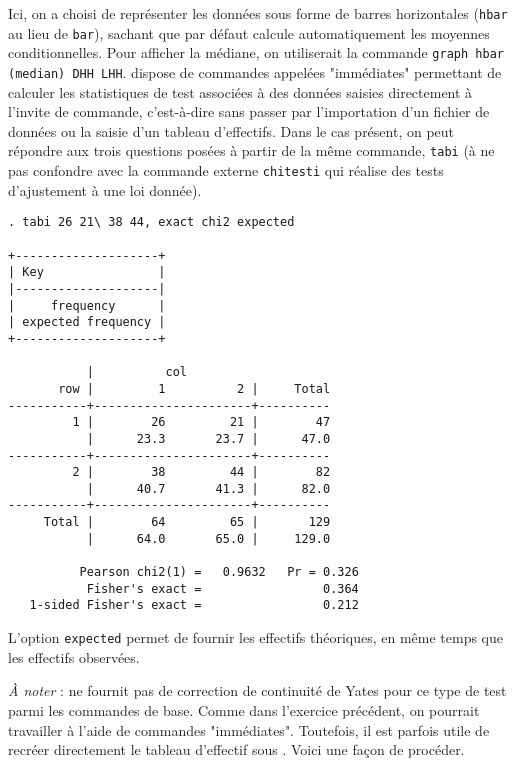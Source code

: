 Ici, on a choisi de représenter les données sous forme de barres
horizontales (\texttt{hbar} au lieu de \texttt{bar}), sachant que par défaut
\Stata calcule automatiquement les moyennes conditionnelles. Pour afficher la
médiane, on utiliserait la commande \verb|graph hbar (median) DHH LHH|.
% 
%
%
\soln{\ref{exo:9.3}} \Stata dispose de commandes appelées "immédiates"
permettant de calculer les statistiques de test associées à des données
saisies directement à l'invite de commande, c'est-à-dire sans passer par
l'importation d'un fichier de données ou la saisie d'un tableau
d'effectifs. Dans le cas présent, on peut répondre aux trois questions
posées à partir de la même commande, \texttt{tabi} (à ne pas confondre
avec la commande externe \texttt{chitesti} qui réalise des tests
d'ajustement à une loi donnée).  
\begin{verbatim}
. tabi 26 21\ 38 44, exact chi2 expected

+--------------------+
| Key                |
|--------------------|
|     frequency      |
| expected frequency |
+--------------------+

           |          col
       row |         1          2 |     Total
-----------+----------------------+----------
         1 |        26         21 |        47 
           |      23.3       23.7 |      47.0 
-----------+----------------------+----------
         2 |        38         44 |        82 
           |      40.7       41.3 |      82.0 
-----------+----------------------+----------
     Total |        64         65 |       129 
           |      64.0       65.0 |     129.0 

          Pearson chi2(1) =   0.9632   Pr = 0.326
           Fisher's exact =                 0.364
   1-sided Fisher's exact =                 0.212
\end{verbatim}
L'option \verb|expected| permet de fournir les effectifs théoriques, en même
temps que les effectifs observées.

\emph{À noter} : \Stata ne fournit pas de correction de continuité de Yates pour ce
type de test parmi les commandes de base.  
%
%
%
\soln{\ref{exo:9.4}} Comme dans l'exercice précédent, on pourrait travailler
à l'aide de commandes "immédiates". Toutefois, il est parfois utile de
recréer directement le tableau d'effectif sous \Stata. Voici une façon de
procéder. \label{exo:3.5stata}

